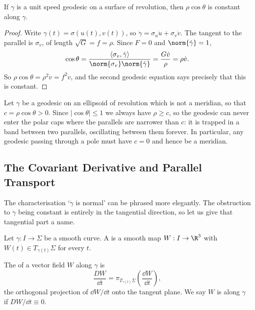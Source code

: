 \begin{theorem}
    If $\gamma$ is a unit speed geodesic on a surface of revolution, then $\rho \cos \theta$ is constant along $\gamma$.
\end{theorem}
\begin{proof}
    Write $\gamma(t) = \sigma(u(t), v(t))$, so $\dot\gamma = \sigma_u \dot u + \sigma_v\dot v$. The tangent to the parallel is $\sigma_v$, of length $\sqrt{G} = f = \rho$. Since $F = 0$ and $\norm{\dot\gamma} = 1$,
    $$
    \cos\theta = \frac{\langle \sigma_v, \dot\gamma\rangle}{\norm{\sigma_v}\norm{\dot\gamma}} = \frac{G\dot v}{\rho} = \rho\dot v.
    $$
    So $\rho\cos\theta = \rho^2 \dot v = f^2 \dot v$, and the second geodesic equation says precisely that this is constant.
\end{proof}

\begin{example}
    Let $\gamma$ be a geodesic on an ellipsoid of revolution which is not a meridian, so that $c = \rho\cos\theta > 0$. Since $|\cos\theta| \leq 1$ we always have $\rho \geq c$, so the geodesic can never enter the polar caps where the parallels are narrower than $c$: it is trapped in a band between two parallels, oscillating between them forever. In particular, any geodesic passing through a pole must have $c = 0$ and hence be a meridian.
\end{example}

\subsection{The Covariant Derivative and Parallel Transport}

The characterisation `$\ddot\gamma$ is normal' can be phrased more elegantly. The obstruction to $\dot\gamma$ being constant is entirely in the tangential direction, so let us give that tangential part a name.

\begin{definition}
    Let $\gamma: I \rightarrow \Sigma$ be a smooth curve. A  is a smooth map $W: I \rightarrow \R^3$ with $W(t) \in T_{\gamma(t)}\Sigma$ for every $t$.
\end{definition}

\begin{definition}
    The  of a vector field $W$ along $\gamma$ is
    $$
    \frac{DW}{\dd t} = \pi_{T_{\gamma(t)}\Sigma}\left(\frac{\dd W}{\dd t}\right),
    $$
    the orthogonal projection of $\dd W/\dd t$ onto the tangent plane. We say $W$ is  along $\gamma$ if $DW/\dd t \equiv 0$.
\end{definition}

